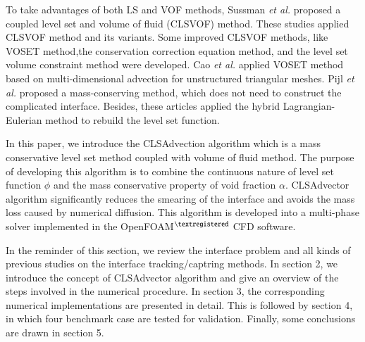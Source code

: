 To take advantages of both LS and VOF methods, Sussman \textit{et al.}\cite{SUSSMAN2000301,SUSSMAN2003110} proposed a coupled level set and volume of fluid (CLSVOF) method. These studies applied CLSVOF method and its variants\cite{wang2012new,wang2010sharp,lv2010novel,menard2007coupling,yang2006adaptive,son2003efficient}.
Some improved CLSVOF methods, like VOSET method\cite{sun2010coupled},the conservation correction equation method\cite{kees2011conservative}, and the level set volume constraint method\cite{wang2012hybrid} were developed. Cao \textit{et al.}\cite{cao2018coupled} applied VOSET method based on multi-dimensional advection for unstructured triangular meshes. Pijl \textit{et al.} \cite{van2008computing,van2005mass} proposed a mass-conserving method, which does not need to construct the complicated interface. Besides, these articles\cite{le20133d,trontin2012subgrid,hieber2005lagrangian,enright2002hybrid} applied the hybrid Lagrangian-Eulerian method to rebuild the level set function.


In this paper, we introduce the CLSAdvection algorithm which is a mass conservative level set method coupled with volume of fluid method. The purpose of developing this algorithm is to combine the continuous nature of level set function $\phi$ and the mass conservative property of void fraction $\alpha$. CLSAdvector algorithm significantly reduces the smearing of the interface and avoids the mass loss caused by numerical diffusion. This algorithm is developed into a multi-phase solver implemented in the OpenFOAM$^{\textregistered}$ CFD software.

In the reminder of this section, we review the interface problem and all kinds of previous studies on the interface tracking/captring methods. In section 2, we introduce the concept of CLSAdvector algorithm and give an overview of the steps involved in the numerical procedure. In section 3, the corresponding numerical implementations are presented in detail. This is followed by section 4, in which four benchmark case are tested for validation. Finally, some conclusions are drawn in section 5.

